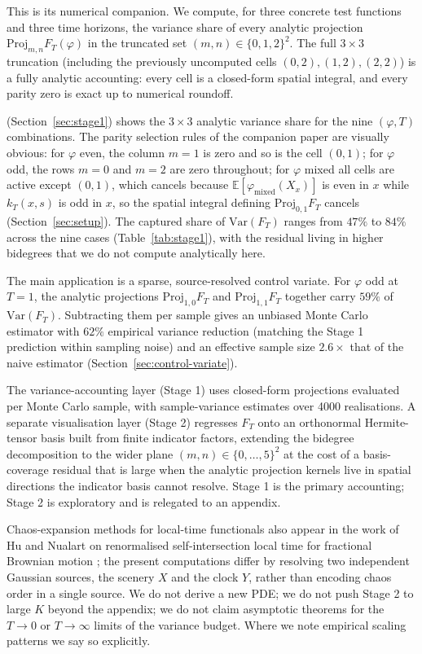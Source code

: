 \documentclass[11pt,reqno]{amsart}
\theoremstyle{plain}
\theoremstyle{definition}
\theoremstyle{remark}
\newcommand{\E}{\mathbb{E}}
\newcommand{\Var}{\mathrm{Var}}
\newcommand{\Proj}{\mathrm{Proj}}
\begin{document}
This is its numerical companion. We compute, for three concrete
test functions and three time horizons, the variance share of every
analytic projection $\Proj_{m,n} F_T(\varphi)$ in the truncated set
$(m, n) \in \{0, 1, 2\}^2$. The full $3 \times 3$ truncation
(including the previously uncomputed cells $(0, 2), (1, 2), (2, 2)$)
is a fully analytic accounting: every cell is a closed-form spatial
integral, and every parity zero is exact up to numerical roundoff.

 (Section~\ref{sec:stage1}) shows the $3 \times 3$
analytic variance share for the nine $(\varphi, T)$ combinations.
The parity selection rules of the companion paper are visually
obvious: for $\varphi$ even, the column $m = 1$ is zero and so is
the cell $(0, 1)$; for $\varphi$ odd, the rows $m = 0$ and $m = 2$
are zero throughout; for $\varphi$ mixed all cells are active except
$(0, 1)$, which cancels because $\E[\varphi_{\mathrm{mixed}}(X_x)]$
is even in $x$ while $k_T(x, s)$ is odd in $x$, so the spatial
integral defining $\Proj_{0, 1} F_T$ cancels (Section~\ref{sec:setup}).
The captured share of $\Var(F_T)$ ranges from $47\%$ to $84\%$ across
the nine cases (Table~\ref{tab:stage1}), with the residual living in
higher bidegrees that we do not compute analytically here.

The main application is a sparse, source-resolved control variate.
For $\varphi$ odd at $T = 1$, the analytic projections
$\Proj_{1,0} F_T$ and $\Proj_{1,1} F_T$ together carry $59\%$ of
$\Var(F_T)$. Subtracting them per sample gives an unbiased Monte
Carlo estimator with $62\%$ empirical variance reduction (matching
the Stage 1 prediction within sampling noise) and an effective
sample size $2.6\times$ that of the naive estimator
(Section~\ref{sec:control-variate}).

The variance-accounting layer (Stage 1) uses closed-form projections
evaluated per Monte Carlo sample, with sample-variance estimates
over 4000 realisations. A separate visualisation layer (Stage 2)
regresses $F_T$ onto an orthonormal Hermite-tensor basis built from
finite indicator factors, extending the bidegree decomposition to
the wider plane $(m, n) \in \{0, \dots, 5\}^2$ at the cost of a
basis-coverage residual that is large when the analytic projection
kernels live in spatial directions the indicator basis cannot
resolve. Stage 1 is the primary accounting; Stage 2 is exploratory
and is relegated to an appendix.

Chaos-expansion methods for local-time functionals also appear in
the work of Hu and Nualart on renormalised self-intersection local
time for fractional Brownian motion \cite{HuNualart}; the present
computations differ by resolving two independent Gaussian sources,
the scenery $X$ and the clock $Y$, rather than encoding chaos order
in a single source. We do not derive a new PDE; we do not push
Stage 2 to large $K$ beyond the appendix; we do not claim asymptotic
theorems for the $T \to 0$ or $T \to \infty$ limits of the variance
budget. Where we note empirical scaling patterns we say so
explicitly.
\end{document}
